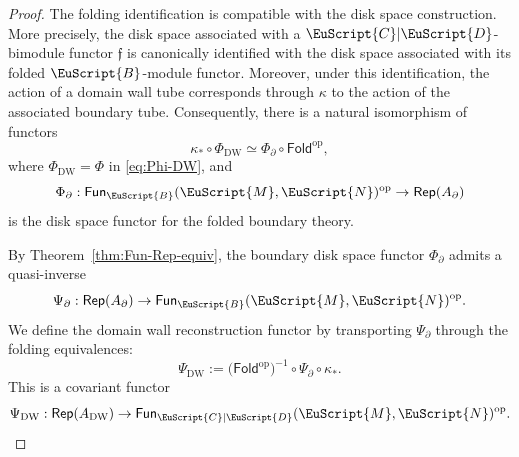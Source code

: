 \documentclass[a4paper,11pt]{article}
\theoremstyle{definition}
\theoremstyle{remark}
\newcommand\eB           {\EuScript{B}}
\newcommand\eC           {\EuScript{C}}
\newcommand\eD           {\EuScript{D}}
\newcommand\eM          {\EuScript{M}}
\newcommand\eN         {\EuScript{N}}
\newcommand{\Rep}{\mathsf{Rep}}
\newcommand{\Fun}{\mathsf{Fun}}
\begin{document}
\begin{proof}
The folding identification is compatible with the disk space construction. More precisely, the disk space associated with a $\eC|\eD$-bimodule functor $\mathfrak f$ is canonically identified with the disk space associated with its folded $\eB$-module functor. Moreover, under this identification, the action of a domain wall tube corresponds through $\kappa$ to the action of the associated boundary tube. Consequently, there is a natural isomorphism of functors
\begin{equation}
    \label{eq:fold-disk-space-compatibility}
    \kappa_*\circ\Phi_{\mathrm{DW}}\simeq\Phi_{\partial}\circ\mathsf{Fold}^{\mathrm{op}},
\end{equation}
where $\Phi_{\mathrm{DW}} = \Phi$ in \eqref{eq:Phi-DW}, and 
\begin{equation*}
    \Phi_{\partial}:\Fun_{\eB}(\eM,\eN)^{\mathrm{op}}\to\Rep(A_{\partial})
\end{equation*}
is the disk space functor for the folded boundary theory.

By Theorem~\ref{thm:Fun-Rep-equiv}, the boundary disk space functor $\Phi_{\partial}$ admits a quasi-inverse
\begin{equation*}
    \Psi_{\partial}:\Rep(A_{\partial}) \to \Fun_{\eB}(\eM,\eN)^{\mathrm{op}}.
\end{equation*}
We define the domain wall reconstruction functor by transporting $\Psi_{\partial}$ through the folding equivalences:
\begin{equation*}
    \Psi_{\mathrm{DW}}:= \bigl(\mathsf{Fold}^{\mathrm{op}}\bigr)^{-1} \circ\Psi_{\partial}\circ\kappa_*.
\end{equation*}
This is a covariant functor
\begin{equation*}
    \Psi_{\mathrm{DW}}: \Rep(A_{\mathrm{DW}}) \to \Fun_{\eC|\eD}(\eM,\eN)^{\mathrm{op}}.
\end{equation*}


\end{proof}
\end{document}
